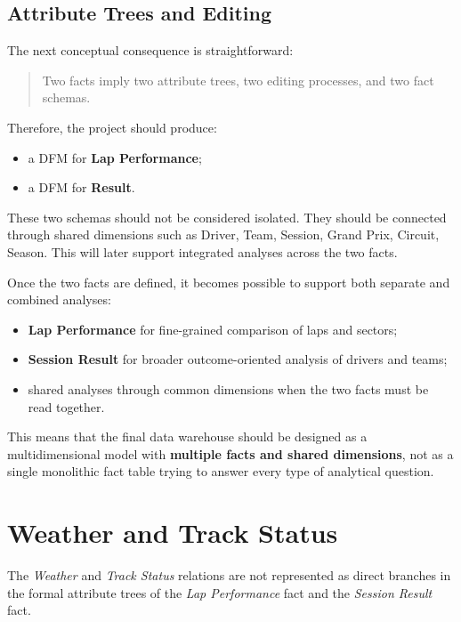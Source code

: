 \documentclass[a4paper,11pt]{article}
\begin{document}
	\subsection{Attribute Trees and Editing}
	
	The next conceptual consequence is straightforward:
	\begin{quote}
		Two facts imply two attribute trees, two editing processes, and two fact schemas.
	\end{quote}
	
	Therefore, the project should produce:
	\begin{itemize}[leftmargin=1.5em]
		\item a DFM for \textbf{Lap Performance};
		\item a DFM for \textbf{Result}.
	\end{itemize}
	
	These two schemas should not be considered isolated. They should be connected through shared dimensions such as Driver, Team, Session, Grand Prix, Circuit, Season. This will later support integrated analyses across the two facts.
	

	Once the two facts are defined, it becomes possible to support both separate and combined analyses:
	\begin{itemize}[leftmargin=1.5em]
		\item \textbf{Lap Performance} for fine-grained comparison of laps and sectors;
		\item \textbf{Session Result} for broader outcome-oriented analysis of drivers and teams;
		\item shared analyses through common dimensions when the two facts must be read together.
	\end{itemize}
	
	This means that the final data warehouse should be designed as a multidimensional model with \textbf{multiple facts and shared dimensions}, not as a single monolithic fact table trying to answer every type of analytical question.
	
	
	
	\section{Weather and Track Status}
	

	The \textit{Weather} and \textit{Track Status} relations are not represented as direct
	branches in the formal attribute trees of the \textit{Lap Performance} fact and the
	\textit{Session Result} fact.
	
\end{document}
